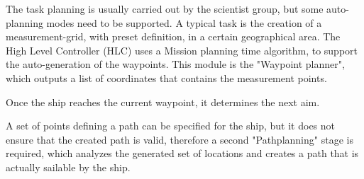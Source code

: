 The task planning is usually carried out by the scientist group, but some auto-planning modes need to be supported. A typical task is the creation of a measurement-grid, with preset definition, in a certain geographical area. The High Level Controller (HLC) uses a Mission planning time algorithm, to support the auto-generation of the waypoints. This module is the "Waypoint planner", which outputs a list of coordinates that contains the measurement points.

Once the ship reaches the current waypoint, it determines the next aim.

A set of points defining a path can be specified for the ship, but it does not ensure that the created path is valid, therefore a second "Pathplanning" stage is required, which analyzes the generated set of locations and creates a path that is actually sailable by the ship.
